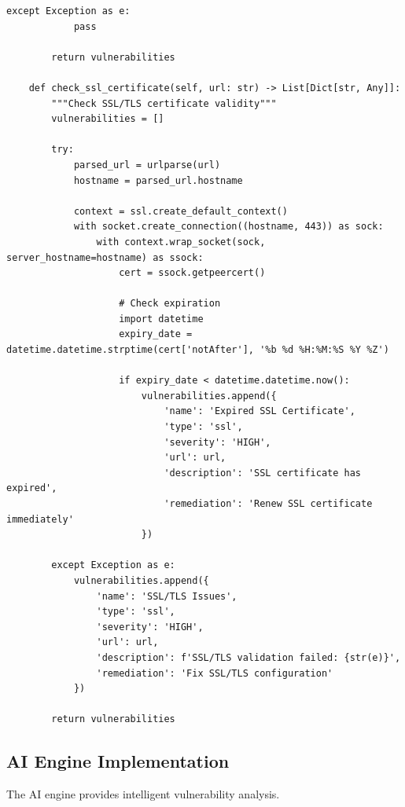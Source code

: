 \documentclass[12pt,a4paper]{report}
\begin{document}
\begin{lstlisting}[caption=Web Scanner Implementation]
        except Exception as e:
            pass
            
        return vulnerabilities
    
    def check_ssl_certificate(self, url: str) -> List[Dict[str, Any]]:
        """Check SSL/TLS certificate validity"""
        vulnerabilities = []
        
        try:
            parsed_url = urlparse(url)
            hostname = parsed_url.hostname
            
            context = ssl.create_default_context()
            with socket.create_connection((hostname, 443)) as sock:
                with context.wrap_socket(sock, server_hostname=hostname) as ssock:
                    cert = ssock.getpeercert()
                    
                    # Check expiration
                    import datetime
                    expiry_date = datetime.datetime.strptime(cert['notAfter'], '%b %d %H:%M:%S %Y %Z')
                    
                    if expiry_date < datetime.datetime.now():
                        vulnerabilities.append({
                            'name': 'Expired SSL Certificate',
                            'type': 'ssl',
                            'severity': 'HIGH',
                            'url': url,
                            'description': 'SSL certificate has expired',
                            'remediation': 'Renew SSL certificate immediately'
                        })
                        
        except Exception as e:
            vulnerabilities.append({
                'name': 'SSL/TLS Issues',
                'type': 'ssl',
                'severity': 'HIGH',
                'url': url,
                'description': f'SSL/TLS validation failed: {str(e)}',
                'remediation': 'Fix SSL/TLS configuration'
            })
            
        return vulnerabilities
\end{lstlisting}

\subsection{AI Engine Implementation}

The AI engine provides intelligent vulnerability analysis.
\end{document}
